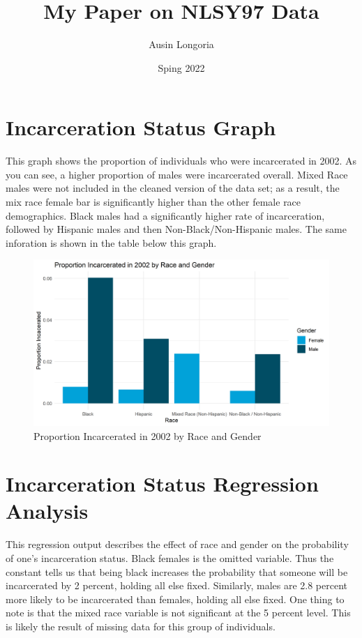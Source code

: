 \documentclass{article}
\author{Ausin Longoria}
\title{My Paper on NLSY97 Data}
\date{Sping 2022}
\begin{document}
\maketitle

\section{Incarceration Status Graph}

This graph shows the proportion of individuals who were incarcerated in 2002. As you can see, a higher proportion of males were incarcerated overall. Mixed Race males were not included in the cleaned version of the data set; as a result, the mix race female bar is significantly higher than the other female race demographics. Black males had a significantly higher rate of incarceration, followed by Hispanic males and then Non-Black/Non-Hispanic males. The same inforation is shown in the table below this graph.

\begin{figure}[H]
    \begin{center}
        \includegraphics[width=.85\textwidth]{incarcerated_by_racegender.png}
    \end{center}
    \caption{Proportion Incarcerated in 2002 by Race and Gender}
    \label{fig:graph}
\end{figure}



\newpage
\section{Incarceration Status Regression Analysis}



This regression output describes the effect of race and gender on the probability of one's incarceration status. Black females is the omitted variable. Thus the constant tells us that being black increases the probability that someone will be incarcerated by 2 percent, holding all else fixed. Similarly, males are 2.8 percent more likely to be incarcerated than females, holding all else fixed. One thing to note is that the mixed race variable is not significant at the 5 percent level. This is likely the result of missing data for this group of individuals.
\end{document}
